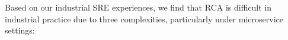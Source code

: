 
Based on our industrial SRE experiences, we find that RCA is difficult in industrial practice due to three complexities, particularly under microservice settings:%
